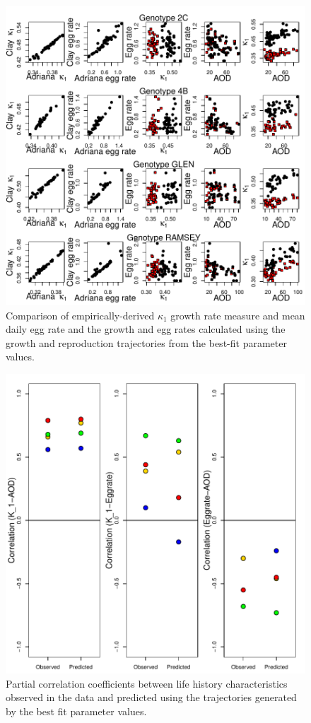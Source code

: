 \documentclass[12pt,reqno,final]{amsart}
\theoremstyle{plain}
\numberwithin{equation}{part}
\begin{document}
\begin{figure}
\includegraphics{Comparing_best_fit_parameters_against_Adriana_winners_and_losers-001}
\caption{Comparison of empirically-derived $\kappa_1$ growth rate
  measure and mean daily egg rate and the growth and egg rates
  calculated using the growth and reproduction trajectories from the
  best-fit parameter values.}
\end{figure}

\begin{figure}
\includegraphics{Comparing_best_fit_parameters_against_Adriana_winners_and_losers-002}
\caption{Partial correlation coefficients between life history
  characteristics observed in the data and predicted using the
  trajectories generated by the best fit parameter values.}
\end{figure}
\end{document}
